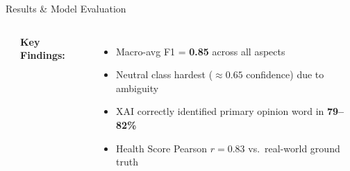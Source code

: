 \documentclass[aspectratio=169]{beamer}
\begin{document}
\begin{frame}{Results \& Model Evaluation}
\begin{columns}[T]
\begin{center}
      \end{center}
      \vspace{0.25cm}
      \textbf{\color{navyblue}Key Findings:}
      \begin{itemize}
        \item Macro-avg F1 = \textbf{0.85} across all aspects
        \item Neutral class hardest ($\approx 0.65$ confidence) due to ambiguity
        \item XAI correctly identified primary opinion word in \textbf{79--82\%}
        \item Health Score Pearson $r = 0.83$ vs.\ real-world ground truth
      \end{itemize}
  \end{columns}
\end{frame}
\end{document}
